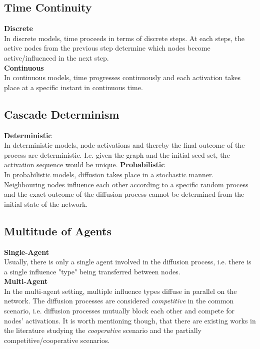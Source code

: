 \documentclass[twocolumn, 10pt]{article}
\begin{document}
\subsection{Time Continuity}
\textbf{Discrete} \\
In discrete models, time proceeds in terms of discrete steps. At each steps, the active nodes from the previous step determine which nodes become active/influenced in the next step.\\
\textbf{Continuous} \\
In continuous models, time progresses continuously and each activation takes place at a specific instant in continuous time. 
\subsection{Cascade Determinism}
\textbf{Deterministic} \\
In deterministic models, node activations and thereby the final outcome of the process are deterministic. I.e. given the graph and the initial seed set, the activation sequence would be unique. 
\textbf{Probabilistic} \\
In probabilistic models, diffusion takes place in a stochastic manner. Neighbouring nodes influence each other according to a specific random process and the exact outcome of the diffusion process cannot be determined from the initial state of the network. 
\subsection{Multitude of Agents}
\textbf{Single-Agent} \\
Usually, there is only a single agent involved in the diffusion process, i.e. there is a single influence "type" being transferred between nodes. \\ 
\textbf{Multi-Agent} \\
In the multi-agent setting, multiple influence types diffuse in parallel on the network. The diffusion processes are considered \textit{competitive} in the common scenario, i.e. diffusion processes mutually block each other and compete for nodes' activations. It is worth mentioning though, that there are existing works in the literature studying the \textit{cooperative} scenario and the partially competitive/cooperative scenarios. 
\end{document}
